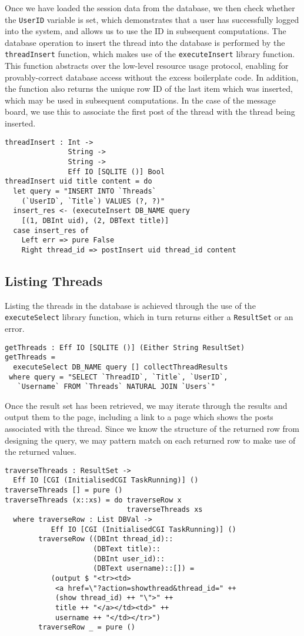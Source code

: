 \documentclass[preprint]{sigplanconf}
\begin{document}
Once we have loaded the session data from the database, we then check whether the \texttt{UserID} variable is set, which demonstrates that a user has successfully logged into the system, and allows us to use the ID in subsequent computations. The database operation to insert the thread into the database is performed by the \texttt{threadInsert} function, which makes use of the \texttt{executeInsert} library function. This function abstracts over the low-level resource usage protocol, enabling for provably-correct database access without the excess boilerplate code. In addition, the function also returns the unique row ID of the last item which was inserted, which may be used in subsequent computations. In the case of the message board, we use this to associate the first post of the thread with the thread being inserted.
\begin{Verbatim}
threadInsert : Int -> 
               String -> 
               String -> 
               Eff IO [SQLITE ()] Bool
threadInsert uid title content = do
  let query = "INSERT INTO `Threads` 
    (`UserID`, `Title`) VALUES (?, ?)"
  insert_res <- (executeInsert DB_NAME query 
    [(1, DBInt uid), (2, DBText title)]
  case insert_res of
    Left err => pure False
    Right thread_id => postInsert uid thread_id content
\end{Verbatim}
\subsection{Listing Threads}
Listing the threads in the database is achieved through the use of the \texttt{executeSelect} library function, which in turn returns either a \texttt{ResultSet} or an error. 
\begin{Verbatim}
getThreads : Eff IO [SQLITE ()] (Either String ResultSet)
getThreads = 
  executeSelect DB_NAME query [] collectThreadResults
 where query = "SELECT `ThreadID`, `Title`, `UserID`, 
   `Username` FROM `Threads` NATURAL JOIN `Users`"
\end{Verbatim}
Once the result set has been retrieved, we may iterate through the results and output them to the page, including a link to a page which shows the posts associated with the thread. Since we know the structure of the returned row from designing the query, we may pattern match on each returned row to make use of the returned values.
\begin{Verbatim}
traverseThreads : ResultSet -> 
  Eff IO [CGI (InitialisedCGI TaskRunning)] ()
traverseThreads [] = pure ()
traverseThreads (x::xs) = do traverseRow x
                             traverseThreads xs
  where traverseRow : List DBVal -> 
           Eff IO [CGI (InitialisedCGI TaskRunning)] ()
        traverseRow ((DBInt thread_id)::
                     (DBText title)::
                     (DBInt user_id)::
                     (DBText username)::[]) =
           (output $ "<tr><td>
            <a href=\"?action=showthread&thread_id=" ++ 
            (show thread_id) ++ "\">" ++ 
            title ++ "</a></td><td>" ++ 
            username ++ "</td></tr>") 
        traverseRow _ = pure ()
\end{Verbatim}
\end{document}
